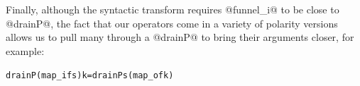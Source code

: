 
Finally, although the syntactic transform requires @funnel_i@ to be close to @drainP@, the fact that our operators come in a variety of polarity versions allows us to pull many through a @drainP@ to bring their arguments closer, for example:
\begin{alltt}
  drainP (map_i f s) k  =  drainP s (map_o f k)
\end{alltt}

